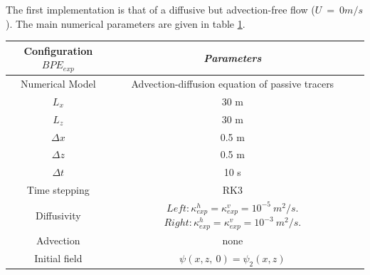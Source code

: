 The first implementation is that of a diffusive but advection-free flow ($U\ =\ 0m/s$). The main numerical parameters are given in table \ref{tab_NUMLAB_exp}.

\begin{table}[h]
        \centering
        \begin{tabular}{|c|c|c|}
                \hline
                Configuration $BPE_{exp}$ & \textit{Parameters}\\
                \hline 
                Numerical Model & Advection-diffusion equation of passive tracers\\
                $L_x$ & 30 m\\
                $L_z$ & 30 m\\
                $\Delta x$ & 0.5 m\\
                $\Delta z$ & 0.5 m\\
                $\Delta t$ & 10 s\\
                Time stepping & RK3 \\
                Diffusivity & $Left: \kappa_{exp}^h=\kappa_{exp}^v=10^{-5}\ m^2/s$. $Right: \kappa_{exp}^h=\kappa_{exp}^v=10^{-3}\ m^2/s$. \\
                Advection & none\\
                Initial field & $\psi(x, z,\ 0)=\psi_2(x,z)$\\
                \hline
        \end{tabular}
        \label{tab_NUMLAB_exp}
\end{table}
